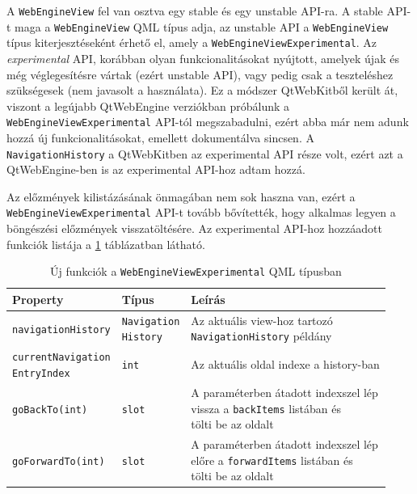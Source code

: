 \documentclass[12pt]{report}
\begin{document}
A \texttt{WebEngineView} fel van osztva egy stable és egy unstable API-ra. A stable API-t
maga a \texttt{WebEngineView} QML típus adja, az unstable API a \texttt{WebEngineView}
típus kiterjesztéseként érhető el, amely a \texttt{WebEngineViewExperimental}.
Az \textit{experimental} API, korábban olyan funkcionalitásokat nyújtott, amelyek újak és
még véglegesítésre vártak (ezért unstable API), vagy pedig csak a teszteléshez szükségesek
(nem javasolt a használata). Ez a módszer QtWebKitből került át, viszont a legújabb
QtWebEngine verziókban próbálunk a \texttt{WebEngineViewExperimental} API-tól megszabadulni,
ezért abba már nem adunk hozzá új funkcionalitásokat, emellett dokumentálva sincsen. A
\texttt{NavigationHistory} a QtWebKitben az experimental API része volt, ezért azt a
QtWebEngine-ben is az experimental API-hoz adtam hozzá.

Az előzmények kilistázásának önmagában nem sok haszna van, ezért a
\texttt{WebEngineViewExperimental} API-t tovább bővítették, hogy alkalmas legyen a böngészési
előzmények visszatöltésére. Az experimental API-hoz hozzáadott funkciók listája a
\ref{tab:navigation-history-experimental-api} táblázatban látható.

\begin{table}[ht]
    \centering
    \begin{tabular}{ | l | l | p{194pt} | }
        \hline
        \textbf{Property} & \textbf{Típus} & \textbf{Leírás} \\ \hline

        \texttt{navigationHistory} & \makecell[l]{\texttt{Navigation} \\ \texttt{History}} &
        \makecell[l]{Az aktuális view-hoz tartozó \\ \texttt{NavigationHistory} példány}
        \\ \hline

        \makecell[l]{\texttt{currentNavigation} \\ \texttt{EntryIndex}} & \texttt{int} &
        Az aktuális oldal indexe a history-ban
        \\ \hline

        \texttt{goBackTo(int)} & \texttt{slot} &
        \makecell[l]{A paraméterben átadott indexszel lép \\
                     vissza a \texttt{backItems} listában és \\
                     tölti be az oldalt}
        \\ \hline

        \texttt{goForwardTo(int)} & \texttt{slot} &
        \makecell[l]{A paraméterben átadott indexszel lép \\
                     előre a \texttt{forwardItems} listában és \\
                     tölti be az oldalt}
        \\ \hline
    \end{tabular}
    \caption{
        \label{tab:navigation-history-experimental-api}
        Új funkciók a \texttt{WebEngineViewExperimental} QML típusban
    }
\end{table}
\end{document}
